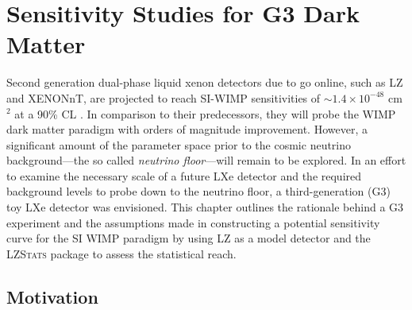 \chapter{Sensitivity Studies for G3 Dark Matter}
\label{chap:chap6}

Second generation dual-phase liquid xenon detectors due to go online, such as LZ and XENONnT, are projected to reach SI-WIMP sensitivities of $\sim1.4 \times 10^{-48}$ cm$^{2}$ at a 90\% CL \cite{akerib2018projected, xenon_1t}. In comparison to their predecessors, they will probe the WIMP dark matter paradigm with orders of magnitude improvement. However, a significant amount of the parameter space prior to the cosmic neutrino background---the so called \textit{neutrino floor}---will remain to be explored. In an effort to examine the necessary scale of a future LXe detector and the required background levels to probe down to the neutrino floor, a third-generation (G3) toy LXe detector was envisioned. This chapter outlines the rationale behind a G3 experiment and the assumptions made in constructing a potential sensitivity curve for the SI WIMP paradigm by using LZ as a model detector and the \textsc{LZStats} package to assess the statistical reach. 


\section{Motivation}
\label{sec:motivation}

